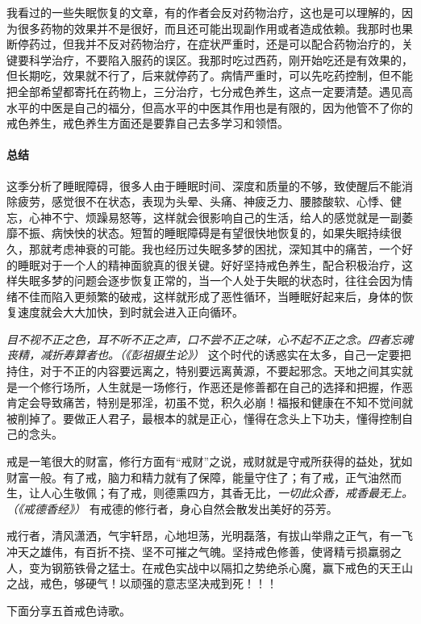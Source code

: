 我看过的一些失眠恢复的文章，有的作者会反对药物治疗，这也是可以理解的，因为很多药物的效果并不是很好，而且还可能出现副作用或者造成依赖。我那时也果断停药过，但我并不反对药物治疗，在症状严重时，还是可以配合药物治疗的，关键要科学治疗，不要陷入服药的误区。我那时吃过西药，刚开始吃还是有效果的，但长期吃，效果就不行了，后来就停药了。病情严重时，可以先吃药控制，但不能把全部希望都寄托在药物上，三分治疗，七分戒色养生，这点一定要清楚。遇见高水平的中医是自己的福分，但高水平的中医其作用也是有限的，因为他管不了你的戒色养生，戒色养生方面还是要靠自己去多学习和领悟。

\paragraph*{总结}

这季分析了睡眠障碍，很多人由于睡眠时间、深度和质量的不够，致使醒后不能消除疲劳，感觉很不在状态，表现为头晕、头痛、神疲乏力、腰膝酸软、心悸、健忘，心神不宁、烦躁易怒等，这样就会很影响自己的生活，给人的感觉就是一副萎靡不振、病怏怏的状态。短暂的睡眠障碍是有望很快地恢复的，如果失眠持续很久，那就考虑神衰的可能。我也经历过失眠多梦的困扰，深知其中的痛苦，一个好的睡眠对于一个人的精神面貌真的很关键。好好坚持戒色养生，配合积极治疗，这样失眠多梦的问题会逐步恢复正常的，当一个人处于失眠的状态时，往往会因为情绪不佳而陷入更频繁的破戒，这样就形成了恶性循环，当睡眠好起来后，身体的恢复速度就会大大加快，到时就会进入正向循环。

\textit{目不视不正之色，耳不听不正之声，口不尝不正之味，心不起不正之念。四者忘魂丧精，减折寿算者也。（《彭祖摄生论》）} 这个时代的诱惑实在太多，自己一定要把持住，对于不正的内容要远离之，特别要远离黄源，不要起邪念。天地之间其实就是一个修行场所，人生就是一场修行，作恶还是修善都在自己的选择和把握，作恶肯定会导致痛苦，特别是邪淫，初虽不觉，积久必崩！福报和健康在不知不觉间就被削掉了。要做正人君子，最根本的就是正心，懂得在念头上下功夫，懂得控制自己的念头。

戒是一笔很大的财富，修行方面有“戒财”之说，戒财就是守戒所获得的益处，犹如财富一般。有了戒，脑力和精力就有了保障，能量守住了；有了戒，正气油然而生，让人心生敬佩；有了戒，则德熏四方，其香无比，\textit{一切此众香，戒香最无上。（《戒德香经》）} 有戒德的修行者，身心自然会散发出美好的芬芳。

戒行者，清风潇洒，气宇轩昂，心地坦荡，光明磊落，有拔山举鼎之正气，有一飞冲天之雄伟，有百折不挠、坚不可摧之气魄。坚持戒色修善，使肾精亏损羸弱之人，变为钢筋铁骨之猛士。在戒色实战中以隔扣之势绝杀心魔，赢下戒色的天王山之战，戒色，够硬气！以顽强的意志坚决戒到死！！！

下面分享五首戒色诗歌。

